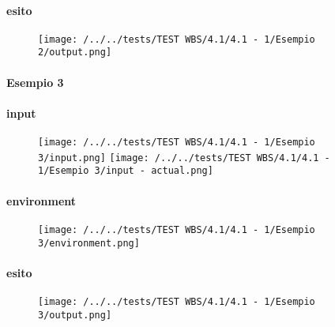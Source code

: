 \paragraph{esito}
\begin{figure}
\centering
\texttt{[image: /../../tests/TEST WBS/4.1/4.1 - 1/Esempio 2/output.png]}
\end{figure}

\paragraph{Esempio 3}
\paragraph{input}
\begin{figure}
\centering
\texttt{[image: /../../tests/TEST WBS/4.1/4.1 - 1/Esempio 3/input.png]}
\texttt{[image: /../../tests/TEST WBS/4.1/4.1 - 1/Esempio 3/input - actual.png]}
\end{figure}
\paragraph{environment}
\begin{figure}
\centering
\texttt{[image: /../../tests/TEST WBS/4.1/4.1 - 1/Esempio 3/environment.png]}
\end{figure}
\paragraph{esito}
\begin{figure}
\centering
\texttt{[image: /../../tests/TEST WBS/4.1/4.1 - 1/Esempio 3/output.png]}
\end{figure}
